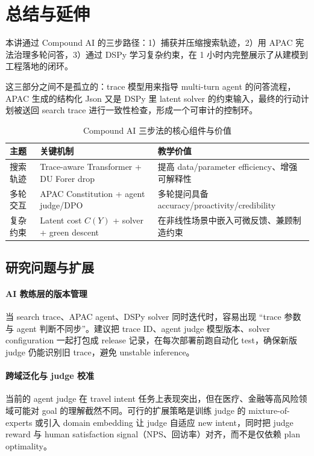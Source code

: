 \section{总结与延伸}

本讲通过 Compound AI 的三步路径：1）捕获并压缩搜索轨迹，2）用 APAC 宪法治理多轮问答，3）通过 DSPy 学习复杂约束，在 1 小时内完整展示了从建模到工程落地的闭环。

这三部分之间不是孤立的：trace 模型用来指导 multi-turn agent 的问答流程，APAC 生成的结构化 Json 又是 DSPy 里 latent solver 的约束输入，最终的行动计划被送回 search trace 进行一致性检查，形成一个可审计的控制环。

\begin{table}[H]
\centering
\begin{tabular}{lp{5cm}p{6cm}}
\toprule
主题 & 关键机制 & 教学价值 \\
\midrule
搜索轨迹 & Trace-aware Transformer + DU Forer drop & 提高 data/parameter efficiency、增强可解释性 \\
多轮交互 & APAC Constitution + agent judge/DPO & 多轮提问具备 accuracy/proactivity/credibility \\
复杂约束 & Latent cost \(C(Y)\) + solver + green descent & 在非线性场景中嵌入可微反馈、兼顾制造约束 \\
\bottomrule
\end{tabular}
\caption{Compound AI 三步法的核心组件与价值}
\end{table}

\subsection{研究问题与扩展}

\paragraph{AI 教练层的版本管理}
当 search trace、APAC agent、DSPy solver 同时迭代时，容易出现 ``trace 参数与 agent 判断不同步''。建议把 trace ID、agent judge 模型版本、solver configuration 一起打包成 release 记录，在每次部署前跑自动化 test，确保新版 judge 仍能识别旧 trace，避免 unstable inference。

\paragraph{跨域泛化与 judge 校准}
当前的 agent judge 在 travel intent 任务上表现突出，但在医疗、金融等高风险领域可能对 goal 的理解截然不同。可行的扩展策略是训练 judge 的 mixture-of-experts 或引入 domain embedding 让 judge 自适应 new intent，同时把 judge reward 与 human satisfaction signal（NPS、回访率）对齐，而不是仅依赖 plan optimality。

